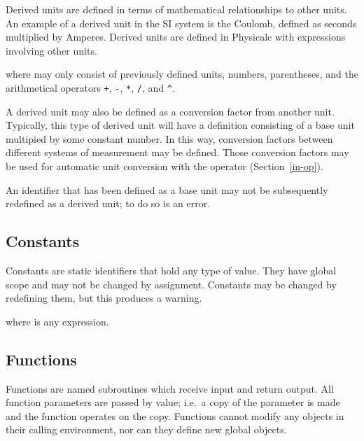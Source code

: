 Derived units are defined in terms of mathematical relationships to
other units.  An example of a derived unit in the SI system is the
Coulomb, defined as seconds multiplied by Amperes.\cite{derived-unit}
Derived units are defined in Physicalc with expressions involving
other units.

\begin{syntax}
 \id{} \key{=} \expr{} 
\end{syntax}
where \expr{} may only consist of previously defined units, numbers,
parentheses, and the arithmetical operators \verb|+|, \verb|-|,
\verb|*|, \verb|/|, and \verb|^|.

A derived unit may also be defined as a conversion factor from another
unit.  Typically, this type of derived unit will have a definition
\expr{} consisting of a base unit multipied by some constant number.
In this way, conversion factors between different systems of
measurement may be defined.  Those conversion factors may be used for
automatic unit conversion with the  operator
(Section~\ref{in-op}).

An identifier that has been defined as a base unit may not be
subsequently redefined as a derived unit; to do so is an error.



\subsection{Constants}
\label{constants}

Constants are static identifiers that hold any type of value.  They
have global scope and may not be changed by assignment.  Constants may
be changed by redefining them, but this produces a warning.

\begin{syntax}
 \id{} \key{=} \expr{}
\end{syntax}
where \expr{} is any expression.


\subsection{Functions}
\label{functions}

Functions are named subroutines which receive input and return output.
All function parameters are passed by value; i.e.\ a copy of the
parameter is made and the function operates on the copy.  Functions
cannot modify any objects in their calling environment, nor can they
define new global objects.

